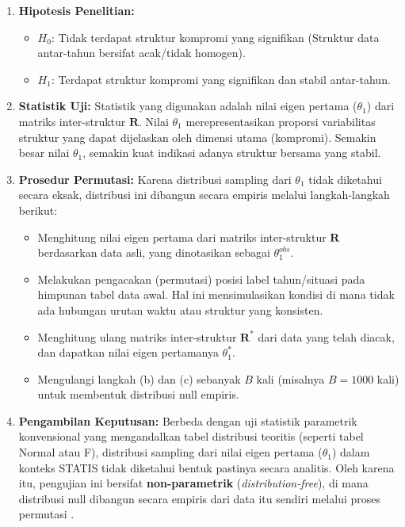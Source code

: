\documentclass[a4paper]{article}
\theoremstyle{definition} %
\begin{document}
\begin{enumerate}
    \item \textbf{Hipotesis Penelitian:}
    \begin{itemize}
        \item $H_0$: Tidak terdapat struktur kompromi yang signifikan (Struktur data antar-tahun bersifat acak/tidak homogen).
        \item $H_1$: Terdapat struktur kompromi yang signifikan dan stabil antar-tahun.
    \end{itemize}
    
    \item \textbf{Statistik Uji:}
    Statistik yang digunakan adalah nilai eigen pertama ($\theta_1$) dari matriks inter-struktur $\mathbf{R}$. Nilai $\theta_1$ merepresentasikan proporsi variabilitas struktur yang dapat dijelaskan oleh dimensi utama (kompromi). Semakin besar nilai $\theta_1$, semakin kuat indikasi adanya struktur bersama yang stabil.
    
    \item \textbf{Prosedur Permutasi:}
    Karena distribusi sampling dari $\theta_1$ tidak diketahui secara eksak, distribusi ini dibangun secara empiris melalui langkah-langkah berikut:
    \begin{itemize}
        \item[a.] Menghitung nilai eigen pertama dari matriks inter-struktur $\mathbf{R}$ berdasarkan data asli, yang dinotasikan sebagai $\theta_1^{obs}$.
        \item[b.] Melakukan pengacakan (permutasi) posisi label tahun/situasi pada himpunan tabel data awal. Hal ini mensimulasikan kondisi di mana tidak ada hubungan urutan waktu atau struktur yang konsisten.
        \item[c.] Menghitung ulang matriks inter-struktur $\mathbf{R}^*$ dari data yang telah diacak, dan dapatkan nilai eigen pertamanya $\theta_1^*$.
        \item[d.] Mengulangi langkah (b) dan (c) sebanyak $B$ kali (misalnya $B=1000$ kali) untuk membentuk distribusi null empiris.
    \end{itemize}

    \item \textbf{Pengambilan Keputusan:}
    Berbeda dengan uji statistik parametrik konvensional yang mengandalkan tabel distribusi teoritis (seperti tabel Normal atau F), distribusi sampling dari nilai eigen pertama ($\theta_1$) dalam konteks STATIS tidak diketahui bentuk pastinya secara analitis. Oleh karena itu, pengujian ini bersifat \textbf{non-parametrik} (\textit{distribution-free}), di mana distribusi null dibangun secara empiris dari data itu sendiri melalui proses permutasi \citet{kazi1995}.
    

\end{enumerate}
\end{document}
